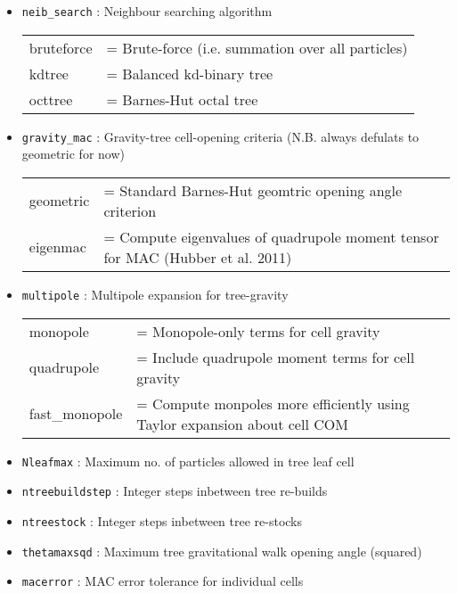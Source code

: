 \documentclass[a4paper]{article}
\newcommand{\var}[1]{\texttt{#1}}
\begin{document}
\begin{itemize}

\item \var{neib\_search} : Neighbour searching algorithm \vspace{0.1cm} \\
\begin{tabular}{ll}
bruteforce & = Brute-force (i.e. summation over all particles) \\
kdtree     & = Balanced kd-binary tree \\
octtree    & = Barnes-Hut octal tree
\end{tabular}

\item \var{gravity\_mac} : Gravity-tree cell-opening criteria (N.B. always defulats to geometric for now) \vspace{0.1cm} \\
\begin{tabular} {ll}
geometric & = Standard Barnes-Hut geomtric opening angle criterion \\
eigenmac  & = Compute eigenvalues of quadrupole moment tensor for MAC (Hubber et al. 2011)
\end{tabular}

\item \var{multipole} : Multipole expansion for tree-gravity \vspace{0.1cm} \\
\begin{tabular} {ll}
monopole       & = Monopole-only terms for cell gravity \\
quadrupole     & = Include quadrupole moment terms for cell gravity \\
fast\_monopole & = Compute monpoles more efficiently using Taylor expansion about cell COM
\end{tabular}

\item \var{Nleafmax} : Maximum no. of particles allowed in tree leaf cell

\item \var{ntreebuildstep} : Integer steps inbetween tree re-builds

\item \var{ntreestock} : Integer steps inbetween tree re-stocks

\item \var{thetamaxsqd} : Maximum tree gravitational walk opening angle (squared)

\item \var{macerror} : MAC error tolerance for individual cells

\end{itemize}
\end{document}
